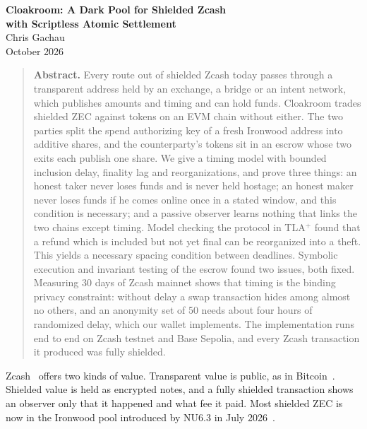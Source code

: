 \documentclass[10pt,letterpaper]{article}
\makeatletter
\renewcommand\section{\@startsection{section}{1}{\z@}{-1.3em}{0.45em}{\normalfont\large\bfseries}}
\theoremstyle{plain}
\theoremstyle{definition}
\makeatother
\begin{document}
\begin{center}
{\Large\bfseries Cloakroom: A Dark Pool for Shielded Zcash\\[0.2em] with Scriptless Atomic Settlement}\\[1.1em]
{\normalsize Chris Gachau}\\[0.25em]
{\small October 2026}
\end{center}

\vspace{0.3em}
\begin{quote}
\small
\textbf{Abstract.} Every route out of shielded Zcash today passes through a transparent address
held by an exchange, a bridge or an intent network, which publishes amounts and timing and can
hold funds. Cloakroom trades shielded ZEC against tokens on an EVM chain without either. The two
parties split the spend authorizing key of a fresh Ironwood address into additive shares, and
the counterparty's tokens sit in an escrow whose two exits each publish one share. We give a
timing model with bounded inclusion delay, finality lag and reorganizations, and prove
three things: an honest taker never loses funds and is never held hostage; an honest maker never
loses funds if he comes online once in a stated window, and this condition is necessary; and a
passive observer learns nothing that links the two chains except timing. Model checking the
protocol in TLA$^+$ found that a refund which is included but not yet final can be reorganized
into a theft. This yields a necessary spacing condition between deadlines. Symbolic execution
and invariant testing of the escrow found two issues, both fixed. Measuring 30 days of Zcash
mainnet shows that timing is the binding privacy constraint: without delay a swap transaction
hides among almost no others, and an anonymity set of 50 needs about four hours of randomized
delay, which our wallet implements. The implementation runs end to end on Zcash testnet and
Base Sepolia, and every Zcash transaction it produced was fully shielded.
\end{quote}

\section{Introduction}

Zcash~\cite{zerocash,spec} offers two kinds of value. Transparent value is public, as in
Bitcoin~\cite{bitcoin}. Shielded value is held as encrypted notes, and a fully shielded transaction
shows an observer only that it happened and what fee it paid. Most shielded ZEC is now in
the Ironwood pool introduced by NU6.3 in July 2026~\cite{zip258}.
\end{document}

